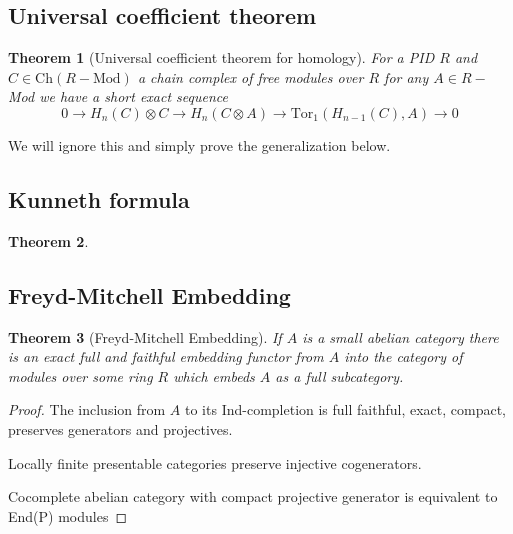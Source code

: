 \documentclass[12pt]{article}
\numberwithin{equation}{section}
\newtheorem{theorem}{Theorem}[section]
\begin{document}
	\subsection{Universal coefficient theorem}
	\begin{theorem}[Universal coefficient theorem for homology]
	For a PID $R$ and $C\in \mathrm{Ch}(R-\mathrm{Mod})$ a chain complex of free modules over $R$ for any $A \in R-$Mod we have a short exact sequence \[ 0 \to H_n(C) \otimes C  \to H_n(C\otimes A) \to \mathrm{Tor}_1(H_{n-1}(C),A) \to 0\]
	\end{theorem}
	We will ignore this and simply prove the generalization below.
	\subsection{Kunneth formula}
	\begin{theorem}
		
	\end{theorem}
	\subsection{Freyd-Mitchell Embedding}
	\begin{theorem}[Freyd-Mitchell Embedding]
		If $A$ is a small abelian category there is an exact full and faithful embedding functor from $A$ into the category of modules over some ring $R$ which embeds $A$ as a full subcategory.
	\end{theorem}
	\begin{proof}
		The inclusion from $A$ to its Ind-completion is full faithful, exact, compact, preserves generators and projectives.
		
		Locally finite presentable categories preserve injective cogenerators.
		
		Cocomplete abelian category with compact projective	generator is equivalent to End(P) modules
	\end{proof}
	
\end{document}
